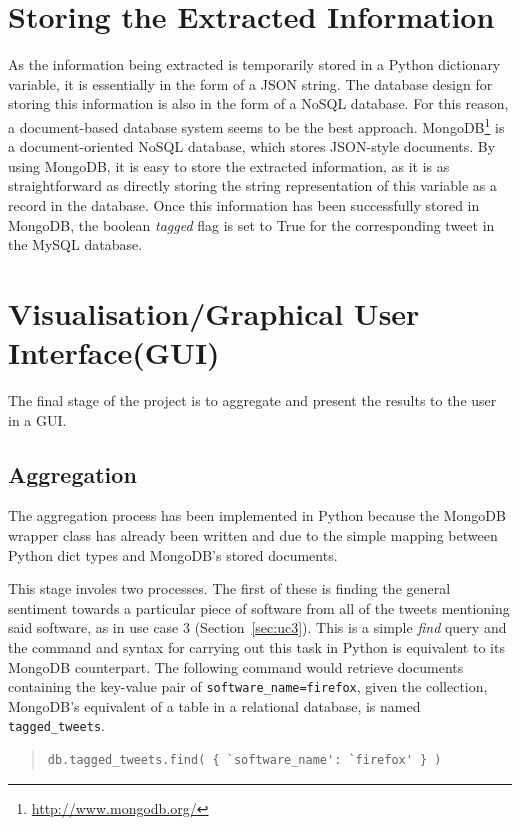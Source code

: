 \section{Storing the Extracted Information}
As the information being extracted is temporarily stored in a Python dictionary variable, it is essentially in the form of a JSON string. The database design for storing this information is also in the form of a NoSQL database. For this reason, a document-based database system seems to be the best approach. MongoDB\footnote{\url{http://www.mongodb.org/}} is a document-oriented NoSQL database, which stores JSON-style documents. By using MongoDB, it is easy to store the extracted information, as it is as straightforward as directly storing the string representation of this variable as a record in the database. Once this information has been successfully stored in MongoDB, the boolean \emph{tagged} flag is set to True for the corresponding tweet in the MySQL database.

\section[Visualisation]{Visualisation/Graphical User Interface(GUI)}
The final stage of the project is to aggregate and present the results to the user in a GUI.

\subsection{Aggregation}
The aggregation process has been implemented in Python because the MongoDB wrapper class has already been written and due to the simple mapping between Python dict types and MongoDB's stored documents.

This stage involes two processes. The first of these is finding the general sentiment towards a particular piece of software from all of the tweets mentioning said software, as in use case 3 (Section~\ref{sec:uc3}). This is a simple \emph{find} query and the command and syntax for carrying out this task in Python is equivalent to its MongoDB counterpart. The following command would retrieve documents containing the key-value pair of \texttt{software\_name=firefox}, given the collection, MongoDB's equivalent of a table in a relational database, is named \texttt{tagged\_tweets}.
\begin{quote} 
\begin{lstlisting}
db.tagged_tweets.find( { `software_name': `firefox' } )
\end{lstlisting}
\end{quote}

